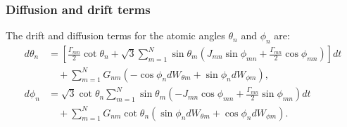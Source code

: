 \documentclass{article}
\begin{document}
    \subsubsection{Diffusion and drift terms}
    The drift and diffusion terms for the atomic angles $\theta_n$ and $\phi_n$ are:
    \begin{align}
        d\theta_n &= \left[\frac{\Gamma_{mn}}{2}\cot\theta_n + \sqrt{3}\sum_{m=1}^{N}\sin\theta_m \left(J_{mn}\sin\phi_{mn} + \frac{\Gamma_{mn}}{2}\cos\phi_{mn}\right)\right] dt \nonumber \\
        &\quad + \sum_{m=1}^{N} G_{nm} \left(-\cos\phi_n dW_{\theta m} + \sin\phi_n dW_{\phi m}\right), \\
        d\phi_n &= \sqrt{3}\cot\theta_n \sum_{m=1}^{N}\sin\theta_m \left(-J_{mn}\cos\phi_{mn} + \frac{\Gamma_{mn}}{2}\sin\phi_{mn}\right) dt \nonumber \\
        &\quad + \sum_{m=1}^{N} G_{nm} \cot\theta_n \left(\sin\phi_n dW_{\theta m} + \cos\phi_n dW_{\phi m}\right).
    \end{align}
\end{document}
